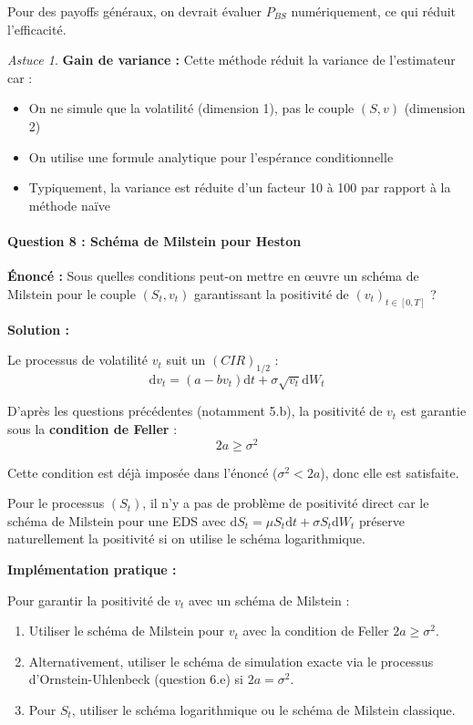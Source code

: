 \documentclass[12pt,a4paper]{article}
\theoremstyle{definition}
\theoremstyle{remark}
\newtheorem*{astuce}{Astuce}
\newcommand{\dd}{\mathrm{d}}
\begin{document}
Pour des payoffs généraux, on devrait évaluer $P_{BS}$ numériquement, ce qui réduit l'efficacité.

\begin{astuce}
\textbf{Gain de variance :} Cette méthode réduit la variance de l'estimateur car :
\begin{itemize}
\item On ne simule que la volatilité (dimension 1), pas le couple $(S, v)$ (dimension 2)
\item On utilise une formule analytique pour l'espérance conditionnelle
\item Typiquement, la variance est réduite d'un facteur 10 à 100 par rapport à la méthode naïve
\end{itemize}
\end{astuce}

\paragraph{Question 8 : Schéma de Milstein pour Heston}

\textbf{Énoncé :} Sous quelles conditions peut-on mettre en œuvre un schéma de Milstein pour le couple $(S_t, v_t)$ garantissant la positivité de $(v_t)_{t \in [0,T]}$ ?

\textbf{Solution :}

Le processus de volatilité $v_t$ suit un $(CIR)_{1/2}$ :
\[
\dd v_t = (a - bv_t)\dd t + \sigma\sqrt{v_t}\dd W_t
\]

D'après les questions précédentes (notamment 5.b), la positivité de $v_t$ est garantie sous la \textbf{condition de Feller} :
\[
\boxed{2a \geq \sigma^2}
\]

Cette condition est déjà imposée dans l'énoncé ($\sigma^2 < 2a$), donc elle est satisfaite.

Pour le processus $(S_t)$, il n'y a pas de problème de positivité direct car le schéma de Milstein pour une EDS avec $\dd S_t = \mu S_t\dd t + \sigma S_t\dd W_t$ préserve naturellement la positivité si on utilise le schéma logarithmique.

\textbf{Implémentation pratique :}

Pour garantir la positivité de $v_t$ avec un schéma de Milstein :
\begin{enumerate}
\item Utiliser le schéma de Milstein pour $v_t$ avec la condition de Feller $2a \geq \sigma^2$.
\item Alternativement, utiliser le schéma de simulation exacte via le processus d'Ornstein-Uhlenbeck (question 6.e) si $2a = \sigma^2$.
\item Pour $S_t$, utiliser le schéma logarithmique ou le schéma de Milstein classique.
\end{enumerate}
\end{document}
